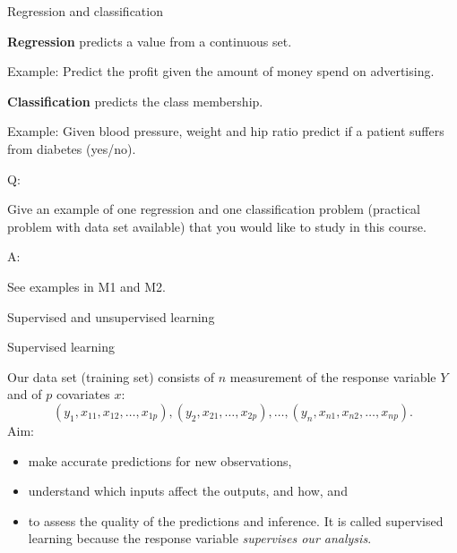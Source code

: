 \documentclass[ignorenonframetext,]{beamer}
\providecommand{\tightlist}{%
  \setlength{\itemsep}{0pt}\setlength{\parskip}{0pt}}
\begin{document}
\begin{frame}

\begin{block}{Regression and classification}

\textbf{Regression} predicts a value from a continuous set.

Example: Predict the profit given the amount of money spend on
advertising.

\textbf{Classification} predicts the class membership.

Example: Given blood pressure, weight and hip ratio predict if a patient
suffers from diabetes (yes/no).

\begin{block}{Q:}

Give an example of one regression and one classification problem
(practical problem with data set available) that you would like to study
in this course.

\end{block}

\begin{block}{A:}

See examples in M1 and M2.

\end{block}

\end{block}

\end{frame}

\begin{frame}{Supervised and unsupervised learning}

\begin{block}{Supervised learning}

Our data set (training set) consists of \(n\) measurement of the
response variable \(Y\) and of \(p\) covariates \(x\):
\[(y_1, x_{11}, x_{12},\ldots, x_{1p}), (y_2, x_{21},\ldots, x_{2p}), \ldots, (y_n, x_{n1}, x_{n2},\ldots, x_{np}).\]
Aim:

\begin{itemize}
\tightlist
\item
  make accurate predictions for new observations,
\item
  understand which inputs affect the outputs, and how, and
\item
  to assess the quality of the predictions and inference. It is called
  supervised learning because the response variable \emph{supervises our
  analysis}.
\end{itemize}

\end{block}

\end{frame}
\end{document}
